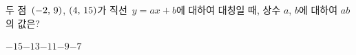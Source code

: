두 점~$(-2,\mkern3mu 9)$, $(4,\mkern3mu 15)$가 직선~$y=ax+b$에 대하여 대칭일 때, 상수 $a$, $b$에 대하여 $ab$의 값은?
\begin{choices32}{$-15$}{$-13$}{$-11$}{$-9$}{$-7$}\end{choices32}
